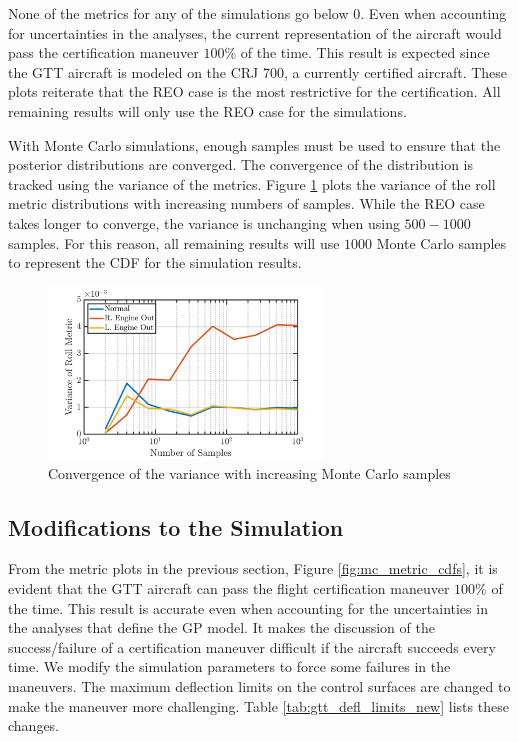 None of the metrics for any of the simulations go below $0$. 
Even when accounting for uncertainties in the analyses, the current representation of the aircraft would pass the certification maneuver $100\%$ of the time.
This result is expected since the GTT aircraft is modeled on the CRJ 700, a currently certified aircraft.
These plots reiterate that the REO case is the most restrictive for the certification. 
All remaining results will only use the REO case for the simulations. 

With Monte Carlo simulations, enough samples must be used to ensure that the posterior distributions are converged.
The convergence of the distribution is tracked using the variance of the metrics.
Figure \ref{fig:mc_var_conv} plots the variance of the roll metric distributions with increasing numbers of samples.
While the REO case takes longer to converge, the variance is unchanging when using $500-1000$ samples. 
For this reason, all remaining results will use $1000$ Monte Carlo samples to represent the CDF for the simulation results. 

\begin{figure}
    \center
    \includegraphics[width=0.65\textwidth]{code/image_gen/cba/Stanford_CFR25_147d_2_R2/images/mc_var_convergence.png}
    \caption{Convergence of the variance with increasing Monte Carlo samples \label{fig:mc_var_conv}}
\end{figure}

\subsection{Modifications to the Simulation} \label{subsec:sim_mods}

From the metric plots in the previous section, Figure \ref{fig:mc_metric_cdfs}, it is evident that the GTT aircraft can pass the flight certification maneuver $100\%$ of the time.
This result is accurate even when accounting for the uncertainties in the analyses that define the GP model. 
It makes the discussion of the success/failure of a certification maneuver difficult if the aircraft succeeds every time.
We modify the simulation parameters to force some failures in the maneuvers.
The maximum deflection limits on the control surfaces are changed to make the maneuver more challenging.
Table \ref{tab:gtt_defl_limits_new} lists these changes.

